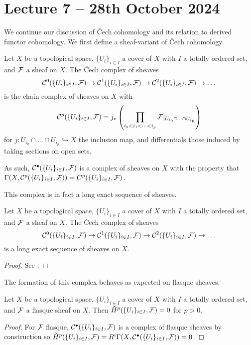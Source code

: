 \section{Lecture 7 -- 28th October 2024}\label{sec: lecture 7}
We continue our discussion of \v{C}ech cohomology and its relation to derived functor cohomology. We first define a sheaf-variant of \v{C}ech cohomology. 
\begin{definition}\label{def: Cech complex of sheaves}
    Let $X$ be a topological space, $\{U_{i}\}_{i\in I}$ a cover of $X$ with $I$ a totally ordered set, and $\mathcal{F}$ a sheaf on $X$. The \v{C}ech complex of sheaves 
    $$\mathcal{C}^{0}(\{U_{i}\}_{i\in I},\mathcal{F})\to\mathcal{C}^{1}(\{U_{i}\}_{i\in I},\mathcal{F})\to\mathcal{C}^{2}(\{U_{i}\}_{i\in I},\mathcal{F})\to\dots$$
    is the chain complex of sheaves on $X$ with 
    $$\mathcal{C}^{p}(\{U_{i}\}_{i\in I},\mathcal{F})=j_{*}\left(\prod_{i_{0}<i_{1}<\dots<i_{p}}\mathcal{F}|_{U_{i_{0}}\cap\dots\cap U_{i_{p}}}\right)$$
    for $j:U_{i_{0}}\cap\dots\cap U_{i_{p}}\hookrightarrow X$ the inclusion map, and differentials those induced by taking sections on open sets. 
\end{definition}
\begin{remark}
    As such, $\mathcal{C}^{\bullet}(\{U_{i}\}_{i\in I},\mathcal{F})$ is a complex of sheaves on $X$ with the property that $\Gamma(X,\mathcal{C}^{p}(\{U_{i}\}_{i\in I},\mathcal{F}))=C^{p}(\{U_{i}\}_{i\in I},\mathcal{F})$. 
\end{remark}
This complex is in fact a long exact sequence of sheaves. 
\begin{proposition}\label{prop: Cech complex of sheaves is a long exact sequence}
    Let $X$ be a topological space, $\{U_{i}\}_{i\in I}$ a cover of $X$ with $I$ a totally ordered set, and $\mathcal{F}$ a sheaf on $X$. The \v{C}ech complex of sheaves 
    $$\mathcal{C}^{0}(\{U_{i}\}_{i\in I},\mathcal{F})\to\mathcal{C}^{1}(\{U_{i}\}_{i\in I},\mathcal{F})\to\mathcal{C}^{2}(\{U_{i}\}_{i\in I},\mathcal{F})\to\dots$$
    is a long exact sequence of sheaves on $X$. 
\end{proposition}
\begin{proof}
    See \cite[Lem. 4.2]{Hartshorne}. 
\end{proof}
The formation of this complex behaves as expected on flasque sheaves. 
\begin{proposition}
    Let $X$ be a topological space, $\{U_{i}\}_{i\in I}$ a cover of $X$ with $I$ a totally ordered set, and $\mathcal{F}$ a flasque sheaf on $X$. Then $\check{H}^{p}(\{U_{i}\}_{i\in I},\mathcal{F})=0$ for $p>0$. 
\end{proposition}
\begin{proof}
    For $\mathcal{F}$ flasque, $\mathcal{C}^{\bullet}(\{U_{i}\}_{i\in I},\mathcal{F})$ is a complex of flasque sheaves by construction so $\check{H}^{p}(\{U_{i}\}_{i\in I},\mathcal{F})=R^{i}\Gamma(X,\mathcal{C}^{\bullet}(\{U_{i}\}_{i\in I},\mathcal{F}))=0$.
\end{proof}
